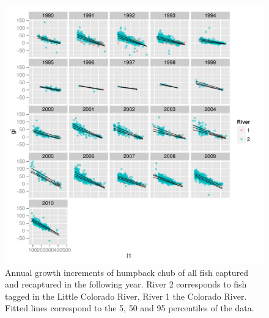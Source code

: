 \begin{figure}[htbp]
	\centering
		\includegraphics[width=6.5in]{../FIGS/LSMR/fig:AnnualGrowthIncrements.pdf}
	\caption{Annual growth increments of humpback chub of all fish captured and recaptured in the following year. River 2 corresponds to fish tagged in the Little Colorado River, River 1 the Colorado River. Fitted lines correspond to the 5, 50 and 95 percentiles of the data.}
	\label{fig:FIGS_LSMR_fig:AnnualGrowthIncrements}
\end{figure}


